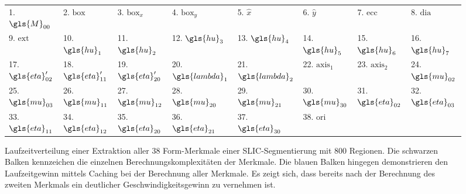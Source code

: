 \begin{figure}[t]
\begin{tikzpicture}[scale=0.33]
\end{tikzpicture}
\begin{tabular}{llllllll}
  \toprule
  1. $\gls{M}_{00}$ & 2. $\mathrm{box}$ & 3. $\mathrm{box}_x$ & 4. $\mathrm{box}_y$ & 5. $\hat{x}$ & 6. $\hat{y}$ & 7. $\mathrm{ecc}$ & 8. $\mathrm{dia}$\\
  9. $\mathrm{ext}$ & 10. $\gls{hu}_1$ & 11. $\gls{hu}_{2}$ & 12. $\gls{hu}_{3}$ & 13. $\gls{hu}_{4}$ & 14. $\gls{hu}_{5}$ & 15. $\gls{hu}_{6}$ & 16. $\gls{hu}_{7}$\\
  17. $\gls{eta}^{\prime}_{02}$ & 18. $\gls{eta}^{\prime}_{11}$ & 19. $\gls{eta}^{\prime}_{20}$ & 20. $\gls{lambda}_1$ & 21. $\gls{lambda}_2$ & 22. $\mathrm{axis}_1$ & 23. $\mathrm{axis}_2$ & 24. $\gls{mu}_{02}$\\
  25. $\gls{mu}_{03}$ & 26. $\gls{mu}_{11}$ & 27. $\gls{mu}_{12}$ & 28. $\gls{mu}_{20}$ & 29. $\gls{mu}_{21}$ & 30. $\gls{mu}_{30}$ & 31. $\gls{eta}_{02}$ & 32. $\gls{eta}_{03}$\\
  33. $\gls{eta}_{11}$ & 34. $\gls{eta}_{12}$ & 35. $\gls{eta}_{20}$ & 36. $\gls{eta}_{21}$ & 37. $\gls{eta}_{30}$ & 38. $\mathrm{ori}$ & & \\
  \bottomrule
\end{tabular}

\caption[Laufzeitverteilung einer Merkmalsextraktion]{Laufzeitverteilung einer Extraktion aller $38$ Form-Merkmale einer \gls{SLIC}-Segmentierung mit $800$ Regionen.
Die schwarzen Balken kennzeichen die einzelnen Berechnungskomplexitäten der Merkmale.
Die blauen Balken hingegen demonstrieren den Laufzeitgewinn mittels Caching bei der Berechnung aller Merkmale.
Es zeigt sich, dass bereits nach der Berechnung des zweiten Merkmals ein deutlicher Geschwindigkeitsgewinn zu vernehmen ist.}
\label{fig:merkmals_caching}
\end{figure}
